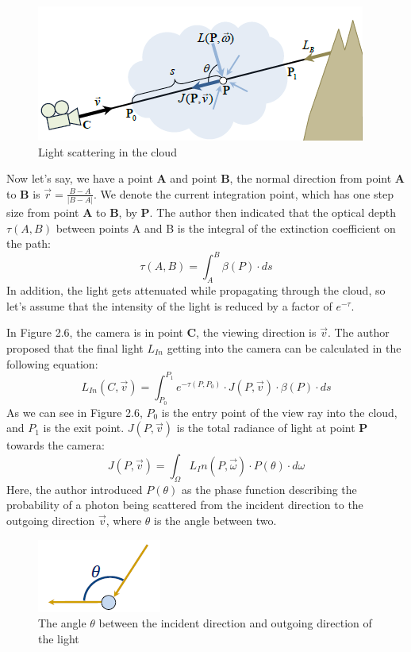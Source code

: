 \begin{figure}[htp]
\begin{center}
\includegraphics[scale=1.0]{images/scatteringscene.png}
\caption{Light scattering in the cloud}
\label{f6}
\end{center}
\end{figure}

Now let's say, we have a point \textbf{A} and point \textbf{B}, the normal direction from point \textbf{A} to \textbf{B} is $\vec{r} = \frac{B-A}{|B-A|}$. We denote the current integration point, which has one step size from point \textbf{A} to \textbf{B}, by \textbf{P}.
The author then indicated that the optical depth $\tau(A, B)$ between points A and B is the integral of the extinction coefficient on the path:
\begin{equation}
\tau(A, B) = \int_{A}^{B}\beta(P)\cdot ds
\end{equation}
In addition, the light gets attenuated while propagating through the cloud, so let's assume that the intensity of the light is reduced by a factor of $e^{-\tau}$.

In Figure 2.6, the camera is in point \textbf{C}, the viewing direction is $\vec{v}$. The author proposed that the final light $L_{In}$ getting into the camera can be calculated in the following equation:
\begin{equation}
L_{In}(C, \vec{v}) = \int_{P_0}^{P_1}e^{-\tau(P, P_0)} \cdot J(P, \vec{v}) \cdot \beta(P) \cdot ds
\end{equation}
As we can see in Figure 2.6, $P_0$ is the entry point of the view ray into the cloud, and $P_1$ is the exit point. $J(P, \vec{v})$ is the total radiance of light at point \textbf{P} towards the camera:
\begin{equation}
J(P, \vec{v}) = \int_{\Omega}L_In(P, \vec{\omega}) \cdot P(\theta) \cdot d\omega
\end{equation}
Here, the author introduced $P(\theta)$ as the phase function describing the probability of a photon being scattered from the incident direction to the outgoing direction $\vec{v}$, where $\theta$ is the angle between two.
\begin{figure}[htp]
\begin{center}
\includegraphics[scale=1.0]{images/phasefunction.png}
\caption{The angle $\theta$ between the incident direction and outgoing direction of the light}
\label{f7}
\end{center}
\end{figure}


